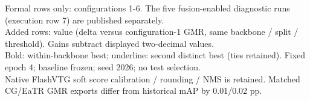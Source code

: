 \documentclass{article}
\begin{document}
Formal rows only: configurations 1-6. The five fusion-enabled diagnostic runs (execution row 7) are published separately.\\Added rows: value (delta versus configuration-1 GMR, same backbone / split / threshold). Gains subtract displayed two-decimal values.\\Bold: within-backbone best; underline: second distinct best (ties retained). Fixed epoch 4; baseline frozen; seed 2026; no test selection.\\Native FlashVTG soft score calibration / rounding / NMS is retained. Matched CG/EaTR GMR exports differ from historical mAP by 0.01/0.02 pp.
\end{document}
